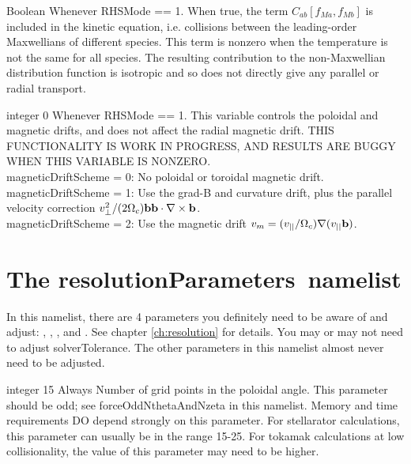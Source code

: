 \myhrule

{Boolean}
{\false}
{Whenever {\ttfamily RHSMode} == 1.}
{When true, the term $C_{ab}[ f_{Ma}, f_{Mb}]$ is included in the kinetic equation,
i.e. collisions between the leading-order Maxwellians of different species.  This term is nonzero
when the temperature is not the same for all species.  The resulting contribution to the non-Maxwellian
distribution function is isotropic and so does not directly give any parallel or radial transport.}

\myhrule

{integer}
{0}
{Whenever {\ttfamily RHSMode} == 1.}
{This variable controls the poloidal and magnetic drifts, and does not affect the radial magnetic drift.
THIS FUNCTIONALITY IS WORK IN PROGRESS, AND RESULTS ARE BUGGY WHEN THIS VARIABLE IS NONZERO.\\

{\ttfamily magneticDriftScheme} = 0:  No poloidal or toroidal magnetic drift.\\

{\ttfamily magneticDriftScheme} = 1: Use the grad-B and curvature drift, plus the parallel velocity correction $v_{\perp}^2/(2 \Omega_c) {\mathbf b} {\mathbf b} \cdot \nabla \times {\mathbf b}$.\\

{\ttfamily magneticDriftScheme} = 2:   Use the magnetic drift $v_m = (v_{||} / \Omega_c) \nabla (v_{||} {\mathbf b})$.
}








\section{The {\ttfamily resolutionParameters}~namelist}

In this namelist, there are 4 parameters you definitely need to be aware of and adjust: \Ntheta, \Nzeta, \Nxi, and \Nx.  
See chapter \ref{ch:resolution} for details. You may or may not
need to adjust {\ttfamily solverTolerance}.  The other parameters in this namelist almost never need to be adjusted.

\myhrule

{integer}
{15}
{Always}
{Number of grid points in the poloidal angle. 
This parameter should be odd; see {\ttfamily forceOddNthetaAndNzeta} in this namelist.
Memory and time requirements DO depend strongly on this parameter.
For stellarator calculations, this parameter can usually be in the range 15-25.
For tokamak calculations at low collisionality, the value of this parameter may need to be higher.}


